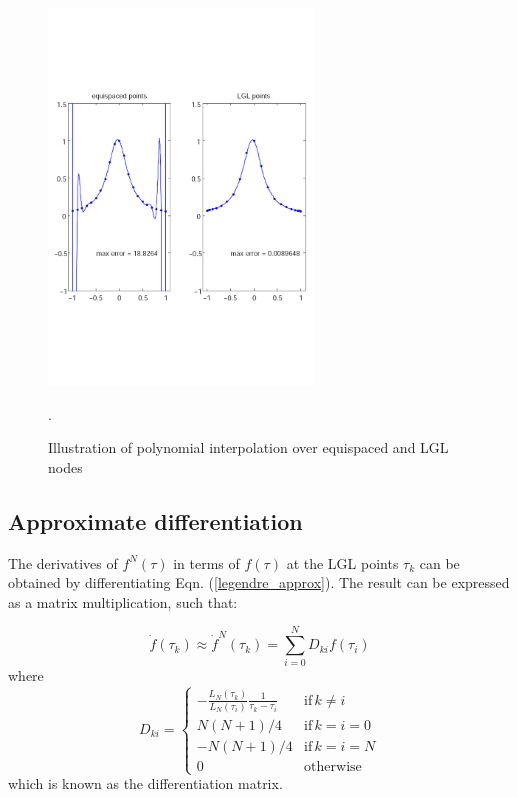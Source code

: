 \documentclass[a4paper,11pt]{report}    %
\begin{document}
\begin{figure}[htbp] 
 \centerline{\includegraphics[height=10cm]{interpolation_example}}
\caption{Illustration of polynomial interpolation over equispaced and LGL nodes}.
\label{fig:interpolation}
\end{figure}


\subsection{Approximate differentiation}

The derivatives of $f^N(\tau)$ in terms of $f(\tau)$ at the LGL points $\tau_k$ can be obtained
by differentiating  Eqn. (\ref{legendre_approx}). The result can be expressed as a matrix
multiplication, such that:

\[ 
  \dot f(\tau_k) \approx \dot f^N(\tau_k) = \sum \limits_{i=0}^N D_{ki} f(\tau_i)
\]
where 
\begin{equation} \label{diff_matrix}
   D_{ki} = \left\{ \begin{matrix} -\frac{L_N(\tau_k)}{L_N(\tau_i)} \frac{1}{\tau_k-\tau_i} & \mathrm{if} \, k\ne i \\
                    N(N+1)/{4} & \mathrm{if} \, k=i=0 \\
                     -N(N+1)/{4} & \mathrm{if} \, k=i=N \\
                        0    & \mathrm{otherwise}  \end{matrix}  \right.
\end{equation}
which is known as the differentiation matrix.
\end{document}

